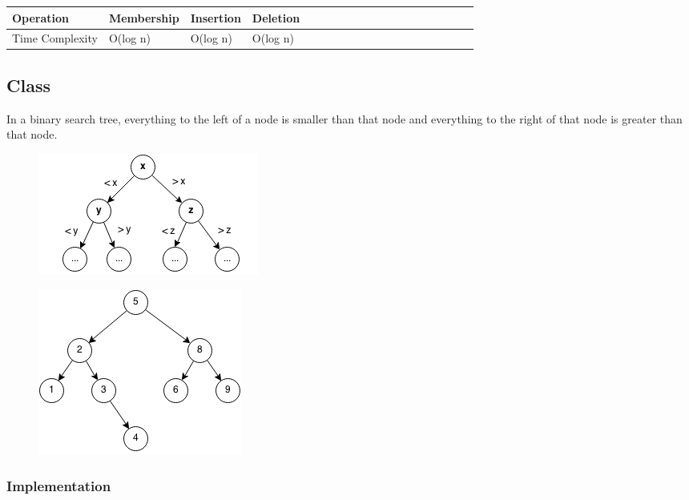 \documentclass[11pt,oneside]{book}
\makeatletter
\def\maxwidth#1{\ifdim\Gin@nat@width>#1 #1\else\Gin@nat@width\fi}
\makeatother
\begin{document}
\vspace{10px}\begin{tabulary}{0.4\linewidth}{|l|l|l|l|l|l|l|l|l|l|l|l|l|l|l|l|l|l|l}\hline


  Operation &
  Membership &
  Insertion &
  Deletion\\
\hline


  Time Complexity &
  O(log n) &
  O(log n) &
  O(log n)\\

\hline\end{tabulary}

\subsection{Class}

In a binary search tree, everything to the left of a node is smaller than that node and everything to the right of that node is greater than that node.

\vspace{5px}\begin{figure}[H]\centering
        \includegraphics[width=0.66\maxwidth{\textwidth}]{bstcompare.png}
        \end{figure}

\vspace{5px}\begin{figure}[H]\centering
        \includegraphics[width=0.66\maxwidth{\textwidth}]{bst.png}
        \end{figure}

\subsubsection{Implementation}
\end{document}
